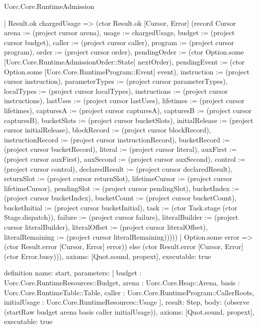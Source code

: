 \begin{lexlean}{Uorc.Core.RuntimeAdmission}
\begin{semanticmodule}
{        | Result.ok chargedUsage => (ctor Result.ok [Cursor, Error] (record Cursor {arena := (project cursor arena), usage := chargedUsage, budget := (project cursor budget), caller := (project cursor caller), program := (project cursor program), order := (project cursor order), pendingOrder := (ctor Option.some [Uorc.Core.RuntimeAdmissionOrder::State] nextOrder), pendingEvent := (ctor Option.some [Uorc.Core.RuntimeProgram::Event] event), instruction := (project cursor instruction), parameterTypes := (project cursor parameterTypes), localTypes := (project cursor localTypes), instructions := (project cursor instructions), lastUses := (project cursor lastUses), lifetimes := (project cursor lifetimes), capturesA := (project cursor capturesA), capturesB := (project cursor capturesB), bucketSlots := (project cursor bucketSlots), initialRelease := (project cursor initialRelease), blockRecord := (project cursor blockRecord), instructionRecord := (project cursor instructionRecord), bucketRecord := (project cursor bucketRecord), literal := (project cursor literal), auxFirst := (project cursor auxFirst), auxSecond := (project cursor auxSecond), control := (project cursor control), declaredResult := (project cursor declaredResult), returnSlot := (project cursor returnSlot), lifetimeCursor := (project cursor lifetimeCursor), pendingSlot := (project cursor pendingSlot), bucketIndex := (project cursor bucketIndex), bucketCount := (project cursor bucketCount), bucketInitial := (project cursor bucketInitial), task := (ctor Task.stage (ctor Stage.dispatch)), failure := (project cursor failure), literalBuilder := (project cursor literalBuilder), literalOffset := (project cursor literalOffset), literalRemaining := (project cursor literalRemaining)}))))
    | Option.some error => (ctor Result.error [Cursor, Error] error)) else (ctor Result.error [Cursor, Error] (ctor Error.busy))),
  axioms: [Quot.sound, propext],
  executable: true
}

definition{
  name: start,
  parameters: [
    budget : Uorc.Core.RuntimeResources::Budget,
    arena : Uorc.Core.Heap::Arena,
    basis : Uorc.Core.RuntimeTable::Table,
    caller : Uorc.Core.RuntimeProgram::CallerRoots,
    initialUsage : Uorc.Core.RuntimeResources::Usage
  ],
  result: Step,
  body: (observe (startRaw budget arena basis caller initialUsage)),
  axioms: [Quot.sound, propext],
  executable: true
}
\end{semanticmodule}
\end{lexlean}
